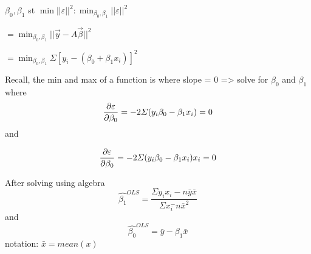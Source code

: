 \documentclass{article}
\begin{document}
$\beta_0, \beta_1$ st  $\displaystyle \min ||\varepsilon||^2: \min_{\beta_0, \beta_1} ||\varepsilon||^2$

$ = \min_{\beta_0, \beta_1} ||\vec{y} - A\vec{\beta}||^2 $

$ = \min_{\beta_0, \beta_1} \varSigma[y_i - (\beta_0 + \beta_1x_i)]^2$

Recall, the min and max of a function is where slope = 0
=> solve for $\beta_0$ and $\beta_1$ where
\begin{equation}
\pdv{\varepsilon}{\beta_0} = -2 \varSigma (y_i \beta_0 - \beta_1x_i) = 0
\end{equation} and

\begin{equation}
\pdv{\varepsilon}{\beta_0} = -2 \varSigma (y_i \beta_0 - \beta_1x_i)x_i = 0
\end{equation}

After solving using algebra
\begin{equation}
	\hat{\beta_1}^{OLS} = \frac{\varSigma y_ix_i - n\bar{y}\bar{x}}{\varSigma x_i^ - n\bar{x}^2}
\end{equation}
and
\begin{equation}
\hat{\beta_0}^{OLS} = \bar{y} - \beta_1 \bar{x}
\end{equation}
notation: $\bar{x} = mean(x)$
\end{document}
